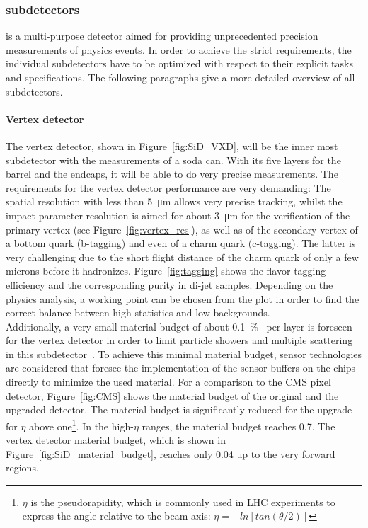 \subsubsection{\sid subdetectors}
\label{ILC:SiD:subdetectors}
\sid is a multi-purpose detector aimed for providing unprecedented precision measurements of physics events.
In order to achieve the strict \sid requirements, the individual subdetectors have to be optimized with respect to their explicit tasks and specifications.
The following paragraphs give a more detailed overview of all \sid subdetectors.

\paragraph{Vertex detector}
The vertex detector, shown in Figure~\ref{fig:SiD_VXD}, will be the inner most subdetector with the measurements of a soda can.
With its five layers for the barrel and the endcaps, it will be able to do very precise measurements.
The requirements for the vertex detector performance are very demanding:
The spatial resolution with less than \SI{5}{\micro\meter} allows very precise tracking, whilst the impact parameter resolution is aimed for about \SI{3}{\micro\meter} for the verification of the primary vertex (see Figure~\ref{fig:vertex_res}), as well as of the secondary vertex of a bottom quark (b-tagging) and even of a charm quark (c-tagging).
The latter is very challenging due to the short flight distance of the charm quark of only a few microns before it hadronizes.
Figure~\ref{fig:tagging} shows the flavor tagging efficiency and the corresponding purity in di-jet samples.
Depending on the physics analysis, a working point can be chosen from the plot in order to find the correct balance between high statistics and low backgrounds.
\\Additionally, a very small material budget of about \SI{0.1}{\percent\xzero} per layer is foreseen for the vertex detector in order to limit particle showers and multiple scattering in this subdetector~\cite{SiD_Update,Marcels_general_SiD_slides}.
To achieve this minimal material budget, sensor technologies are considered that foresee the implementation of the sensor buffers on the chips directly to minimize the used material. 
For a comparison to the CMS pixel detector, Figure~\ref{fig:CMS} shows the material budget of the original and the upgraded detector.
The material budget is significantly reduced for the upgrade for $\eta$ above one\footnote{$\eta$ is the pseudorapidity, which is commonly used in LHC experiments to express the angle relative to the beam axis: $\eta=-ln[tan(\theta/2)]$}.
In the high-$\eta$ ranges, the material budget reaches \SI{0.7}{\xzero}.
The \sid vertex detector material budget, which is shown in Figure~\ref{fig:SiD_material_budget}, reaches only \SI{0.04}{\xzero} up to the very forward regions.

